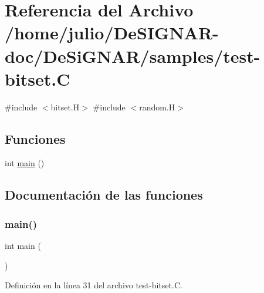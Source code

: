 \hypertarget{test-bitset_8_c}{}\section{Referencia del Archivo /home/julio/\+De\+S\+I\+G\+N\+A\+R-\/doc/\+De\+Si\+G\+N\+A\+R/samples/test-\/bitset.C}
\label{test-bitset_8_c}
{\ttfamily \#include $<$bitset.\+H$>$}\newline
{\ttfamily \#include $<$random.\+H$>$}\newline
\subsection*{Funciones}
\begin{DoxyCompactItemize}
\item 
int \hyperlink{test-bitset_8_c_ae66f6b31b5ad750f1fe042a706a4e3d4}{main} ()
\end{DoxyCompactItemize}


\subsection{Documentación de las funciones}
\mbox{\label{test-bitset_8_c_ae66f6b31b5ad750f1fe042a706a4e3d4}} 
\subsubsection{\texorpdfstring{main()}{main()}}
{\footnotesize\ttfamily int main (\begin{DoxyParamCaption}{ }\end{DoxyParamCaption})}



Definición en la línea 31 del archivo test-\/bitset.\+C.

